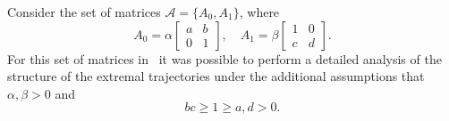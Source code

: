 \documentclass[a4paper,10pt,reqno]{amsart}
\let\cite\citep
\newcommand{\setA}{\mathscr{A}}
\begin{document}
Consider the set of matrices $\setA=\{A_{0},A_{1}\}$, where
\begin{equation}\label{Eq-M1}
A_{0}=\alpha\left[\begin{array}{cc}
  a & b \\
  0 & 1
\end{array}\right],\quad
A_{1}=\beta\left[\begin{array}{cc}
  1 & 0 \\
  c & d
\end{array}\right].
\end{equation}
For this set of matrices in~\cite{Koz:INFOPROC05:e, Koz:INFOPROC06:e} it was
possible to perform a detailed analysis of the structure of the extremal
trajectories under the additional assumptions that $\alpha,\beta > 0$ and
\[
bc\ge 1\ge a,d > 0.
\]
\end{document}
